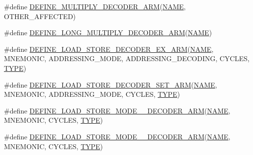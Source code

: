 \begin{DoxyCompactItemize}
\item 
\#define \mbox{\hyperlink{decoder-arm_8c_a7ac82bf2f1f6edae73a429cb9baaf3f1}{D\+E\+F\+I\+N\+E\+\_\+\+M\+U\+L\+T\+I\+P\+L\+Y\+\_\+\+D\+E\+C\+O\+D\+E\+R\+\_\+\+A\+RM}}(\mbox{\hyperlink{inflate_8h_a164ea0159d5f0b5f12a646f25f99eceaa67bc2ced260a8e43805d2480a785d312}{N\+A\+ME}},  O\+T\+H\+E\+R\+\_\+\+A\+F\+F\+E\+C\+T\+ED)
\item 
\#define \mbox{\hyperlink{decoder-arm_8c_a039f026f1a58a81355107a2d6c7de92c}{D\+E\+F\+I\+N\+E\+\_\+\+L\+O\+N\+G\+\_\+\+M\+U\+L\+T\+I\+P\+L\+Y\+\_\+\+D\+E\+C\+O\+D\+E\+R\+\_\+\+A\+RM}}(\mbox{\hyperlink{inflate_8h_a164ea0159d5f0b5f12a646f25f99eceaa67bc2ced260a8e43805d2480a785d312}{N\+A\+ME}})
\item 
\#define \mbox{\hyperlink{decoder-arm_8c_a5d6d802380fe63152e39d49de3ceb848}{D\+E\+F\+I\+N\+E\+\_\+\+L\+O\+A\+D\+\_\+\+S\+T\+O\+R\+E\+\_\+\+D\+E\+C\+O\+D\+E\+R\+\_\+\+E\+X\+\_\+\+A\+RM}}(\mbox{\hyperlink{inflate_8h_a164ea0159d5f0b5f12a646f25f99eceaa67bc2ced260a8e43805d2480a785d312}{N\+A\+ME}},  M\+N\+E\+M\+O\+N\+IC,  A\+D\+D\+R\+E\+S\+S\+I\+N\+G\+\_\+\+M\+O\+DE,  A\+D\+D\+R\+E\+S\+S\+I\+N\+G\+\_\+\+D\+E\+C\+O\+D\+I\+NG,  C\+Y\+C\+L\+ES,  \mbox{\hyperlink{inflate_8h_a164ea0159d5f0b5f12a646f25f99eceaab47ea8bb955afd0adc0ef98517dd6084}{T\+Y\+PE}})
\item 
\#define \mbox{\hyperlink{decoder-arm_8c_ab31bf408eb3c9556d621cfa92cfcda18}{D\+E\+F\+I\+N\+E\+\_\+\+L\+O\+A\+D\+\_\+\+S\+T\+O\+R\+E\+\_\+\+D\+E\+C\+O\+D\+E\+R\+\_\+\+S\+E\+T\+\_\+\+A\+RM}}(\mbox{\hyperlink{inflate_8h_a164ea0159d5f0b5f12a646f25f99eceaa67bc2ced260a8e43805d2480a785d312}{N\+A\+ME}},  M\+N\+E\+M\+O\+N\+IC,  A\+D\+D\+R\+E\+S\+S\+I\+N\+G\+\_\+\+M\+O\+DE,  C\+Y\+C\+L\+ES,  \mbox{\hyperlink{inflate_8h_a164ea0159d5f0b5f12a646f25f99eceaab47ea8bb955afd0adc0ef98517dd6084}{T\+Y\+PE}})
\item 
\#define \mbox{\hyperlink{decoder-arm_8c_a4cbb426429bc500748cfaa69657daf1e}{D\+E\+F\+I\+N\+E\+\_\+\+L\+O\+A\+D\+\_\+\+S\+T\+O\+R\+E\+\_\+\+M\+O\+D\+E\+\_\+\_\+\+D\+E\+C\+O\+D\+E\+R\+\_\+\+A\+RM}}(\mbox{\hyperlink{inflate_8h_a164ea0159d5f0b5f12a646f25f99eceaa67bc2ced260a8e43805d2480a785d312}{N\+A\+ME}},  M\+N\+E\+M\+O\+N\+IC,  C\+Y\+C\+L\+ES,  \mbox{\hyperlink{inflate_8h_a164ea0159d5f0b5f12a646f25f99eceaab47ea8bb955afd0adc0ef98517dd6084}{T\+Y\+PE}})
\item 
\#define \mbox{\hyperlink{decoder-arm_8c_aa3170c6a5c94fbd9812e3ee0b94c3c87}{D\+E\+F\+I\+N\+E\+\_\+\+L\+O\+A\+D\+\_\+\+S\+T\+O\+R\+E\+\_\+\+M\+O\+D\+E\+\_\+\_\+\+D\+E\+C\+O\+D\+E\+R\+\_\+\+A\+RM}}(\mbox{\hyperlink{inflate_8h_a164ea0159d5f0b5f12a646f25f99eceaa67bc2ced260a8e43805d2480a785d312}{N\+A\+ME}},  M\+N\+E\+M\+O\+N\+IC,  C\+Y\+C\+L\+ES,  \mbox{\hyperlink{inflate_8h_a164ea0159d5f0b5f12a646f25f99eceaab47ea8bb955afd0adc0ef98517dd6084}{T\+Y\+PE}})

\end{DoxyCompactItemize}
